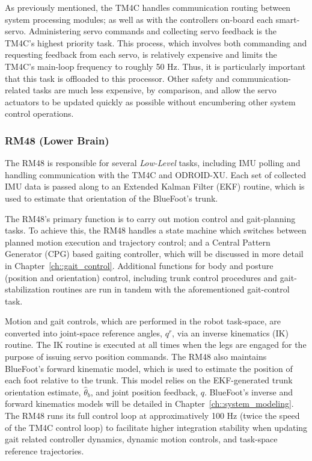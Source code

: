 			As previously mentioned, the TM4C handles communication routing between system processing modules; as well as with the controllers on-board each smart-servo. Administering servo commands and collecting servo feedback is the TM4C's highest priority task. This process, which involves both commanding and requesting feedback from each servo, is relatively expensive  and limits the TM4C's main-loop frequency to roughly 50 Hz. Thus, it is particularly important that this task is offloaded to this processor. Other safety and communication-related tasks are much less expensive, by comparison, and allow the servo actuators to be updated quickly as possible without encumbering other system control operations.


		\subsubsection{RM48 (Lower Brain)}

			The RM48 is responsible for several \emph{Low-Level} tasks, including IMU polling and handling communication with the TM4C and ODROID-XU. Each set of collected IMU data is passed along to an Extended Kalman Filter (EKF) routine, which is used to estimate that orientation of the BlueFoot's trunk.

			The RM48's primary function is to carry out motion control and gait-planning tasks. To achieve this, the RM48 handles a state machine which switches between planned motion execution and trajectory control; and a Central Pattern Generator (CPG) based gaiting controller, which will be discussed in more detail in Chapter~\ref{ch::gait_control}. Additional functions for body and posture (position and orientation) control, including trunk control procedures and gait-stabilization routines are run in tandem with the aforementioned gait-control task.

			Motion and gait controls, which are performed in the robot task-space, are converted into joint-space reference angles, $q^{r}$, via an inverse kinematics (IK) routine. The IK routine is executed at all times when the legs are engaged for the purpose of issuing servo position commands. The RM48 also maintains BlueFoot's forward kinematic model, which is used to estimate the position of each foot relative to the trunk. This model relies on the EKF-generated trunk orientation estimate, $\hat{\theta}_{b}$, and joint position feedback, $q$. BlueFoot's inverse and forward kinematics models will be detailed in Chapter~\ref{ch::system_modeling}. The RM48 runs its full control loop at approximatively 100 Hz (twice the speed of the TM4C control loop) to facilitate higher integration stability when updating gait related controller dynamics, dynamic motion controls, and task-space reference trajectories.

